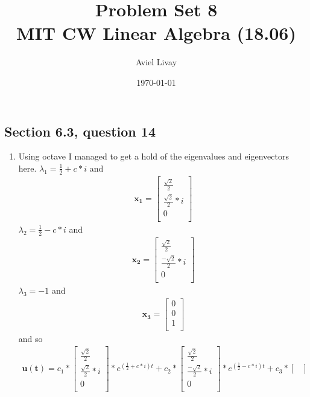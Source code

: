 \documentclass[a4paper,11pt]{article}
\title{%
	Problem Set 8\\
	\large MIT CW Linear Algebra (18.06)
}
\author{Aviel Livay}
\date{\today}
\newcommand{\mybf}[1]{\boldsymbol{#1}}
\begin{document}
\maketitle

\subsection*{Section 6.3, question 14}
\begin{enumerate}
\item
Using octave I managed to get a hold of the eigenvalues and eigenvectors here.
$\lambda_1 = \frac{1}{2}+c*i$ and
\begin{align*}
\mybf{x_1} = 
\begin{bmatrix}
\frac{\sqrt{2}}{2} \\
\frac{\sqrt{2}}{2}*i \\
0 \\
\end{bmatrix}
\end{align*}
$\lambda_2 = \frac{1}{2}-c*i$ and
\begin{align*}
\mybf{x_2} = 
\begin{bmatrix}
\frac{\sqrt{2}}{2} \\
\frac{-\sqrt{2}}{2}*i \\
0 \\
\end{bmatrix}
\end{align*}
$\lambda_3 = -1$ and
\begin{align*}
\mybf{x_3} = 
\begin{bmatrix}
0 \\
0 \\
1 \\
\end{bmatrix}
\end{align*}
and so 
\begin{align*}
\mybf{u(t)}= 
c_1*
\begin{bmatrix}
\frac{\sqrt{2}}{2} \\
\frac{\sqrt{2}}{2}*i \\
0 \\
\end{bmatrix}
*
e^{(\frac{1}{2}+c*i)t}
+
c_2*
\begin{bmatrix}
\frac{\sqrt{2}}{2} \\
\frac{-\sqrt{2}}{2}*i \\
0 \\
\end{bmatrix}
*
e^{(\frac{1}{2}-c*i)t}
+
c_3*
\begin{bmatrix}

\end{bmatrix}
\end{align*}
\end{enumerate}
\end{document}

